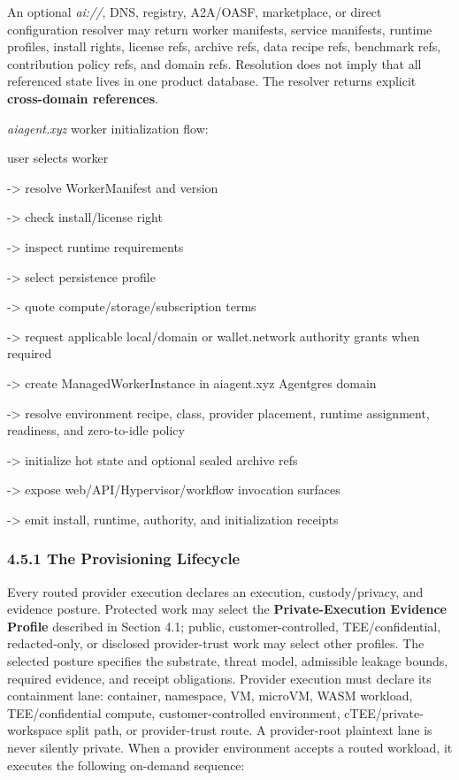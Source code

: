 \documentclass[
  11pt,
]{article}
\begin{document}
An optional \emph{ai://}, DNS, registry, A2A/OASF, marketplace, or direct
configuration resolver may return worker manifests, service manifests,
runtime profiles, install rights, license refs, archive refs, data
recipe refs, benchmark refs, contribution policy refs, and domain refs.
Resolution does not imply that all referenced state lives in one product
database. The resolver returns explicit \textbf{cross-domain
references}.

\emph{aiagent.xyz} worker initialization flow:

user selects worker

-\textgreater{} resolve WorkerManifest and version

-\textgreater{} check install/license right

-\textgreater{} inspect runtime requirements

-\textgreater{} select persistence profile

-\textgreater{} quote compute/storage/subscription terms

-\textgreater{} request applicable local/domain or wallet.network authority
grants when required

-\textgreater{} create ManagedWorkerInstance in aiagent.xyz Agentgres
domain

-\textgreater{} resolve environment recipe, class, provider placement,
runtime assignment, readiness, and zero-to-idle policy

-\textgreater{} initialize hot state and optional sealed archive refs

-\textgreater{} expose web/API/Hypervisor/workflow invocation surfaces

-\textgreater{} emit install, runtime, authority, and initialization
receipts

\hypertarget{the-provisioning-lifecycle}{%
\subsubsection{\texorpdfstring{4.5.1 The Provisioning Lifecycle
}{4.5.1 The Provisioning Lifecycle }}\label{the-provisioning-lifecycle}}

Every routed provider execution declares an execution, custody/privacy, and
evidence posture. Protected work may select the
\textbf{Private-Execution Evidence Profile} described in Section 4.1; public,
customer-controlled, TEE/confidential, redacted-only, or disclosed
provider-trust work may select other profiles. The selected posture specifies
the substrate, threat model, admissible leakage bounds, required evidence, and
receipt obligations. Provider execution must
declare its containment lane: container, namespace, VM, microVM, WASM
workload, TEE/confidential compute, customer-controlled environment,
cTEE/private-workspace split path, or provider-trust route. A provider-root
plaintext lane is never silently private. When a provider environment
accepts a routed workload, it executes the following on-demand sequence:
\end{document}
